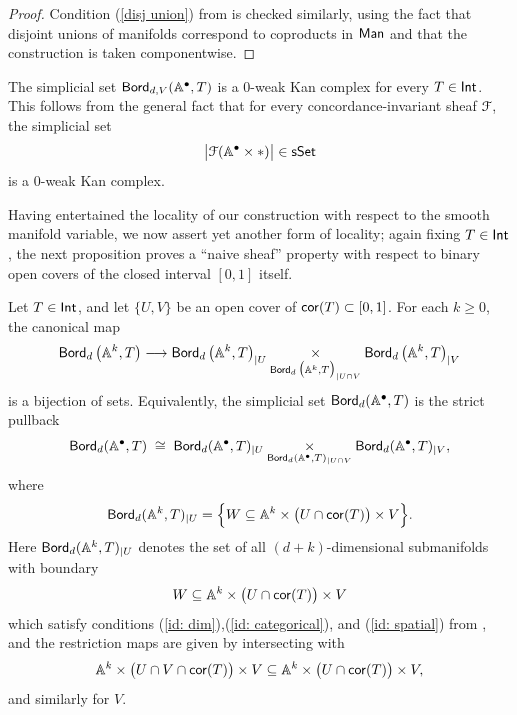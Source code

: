 \begin{proof}
    Condition (\ref{disj union}) from  is checked similarly, using the fact that disjoint unions of manifolds correspond to coproducts in $\operatorname{\sf Man}$ and that the construction is taken componentwise.
\end{proof}
\begin{remark}
    The simplicial set $\operatorname{\mathsf{Bord}}_{d,V}(\mathbb A^{\bullet},T)$ is a $0$-weak Kan complex for every $T\in \operatorname{\mathsf{Int}}$. This follows from the general fact that for every concordance-invariant sheaf $\mathcal F$, the simplicial set 
    \begin{equation}
        \big | \mathcal F(\mathbb A^{\bullet} \times *)\big | \in \operatorname{\sf sSet}
    \end{equation}
    is a $0$-weak Kan complex.
\end{remark}

Having entertained the locality of our construction with respect to the smooth manifold variable, we now assert yet another form of locality; again fixing $T \in \operatorname{\mathsf{Int}}$, the next proposition proves a ``naive sheaf'' property with respect to binary open covers of the closed interval $[0,1]$ itself.

\begin{proposition}\label{ch3:: prop: naive sheaf con}
Let $T\in \operatorname{\mathsf{Int}}$, and let $\{U,V\}$ be an open cover of $\operatorname{{\sf cor}}(T)\subset [0,1]$. For each $k\geq 0$, the canonical map
\begin{equation}
\label{eq:naive sheaf interval levelwise}
\operatorname{\mathsf{Bord}}_d\big(\mathbb A^{k},T\big)\longrightarrow
\operatorname{\mathsf{Bord}}_d\big(\mathbb A^{k},T\big)_{|U}\underset{\operatorname{\mathsf{Bord}}_d\big(\mathbb A^{k},T\big)_{|U\cap V}}{\times}
\operatorname{\mathsf{Bord}}_d\big(\mathbb A^{k},T\big)_{|V}
\end{equation}
is a bijection of sets. Equivalently, the simplicial set $\operatorname{\mathsf{Bord}}_d(\mathbb A^{\bullet},T)$ is the strict pullback
\begin{equation}
\label{eq:naive sheaf interval simplicial}
\operatorname{\mathsf{Bord}}_d(\mathbb A^{\bullet},T)\;\cong\;
\operatorname{\mathsf{Bord}}_d(\mathbb A^{\bullet},T)_{|U}\underset{\operatorname{\mathsf{Bord}}_d(\mathbb A^{\bullet},T)_{|U\cap V}}{\times}
\operatorname{\mathsf{Bord}}_d(\mathbb A^{\bullet},T)_{|V},
\end{equation}
where
\begin{equation}
\label{eq:bord-restriction-U}
\operatorname{\mathsf{Bord}}_d(\mathbb A^{k},T)_{|U}
=
\Big\{
W\subseteq \mathbb A^{k}\times\big(U\cap \operatorname{{\sf cor}}(T)\big)\times V
\Big\}.
\end{equation}
Here $\operatorname{\mathsf{Bord}}_d(\mathbb A^{k},T)_{|U}$ denotes the set of all $(d+k)$-dimensional
submanifolds with boundary
\[
W\subseteq \mathbb A^{k}\times\big(U\cap \operatorname{{\sf cor}}(T)\big)\times V
\]
which satisfy conditions (\ref{id: dim}),(\ref{id: categorical}), and (\ref{id: spatial}) from , and the restriction maps are given by intersecting with
\[
\mathbb A^{k}\times\big(U\cap V\cap \operatorname{{\sf cor}}(T)\big)\times V\subseteq 
\mathbb A^{k}\times\big(U\cap\operatorname{{\sf cor}}(T)\big)\times V,
\]
and similarly for $V$.
\end{proposition}

